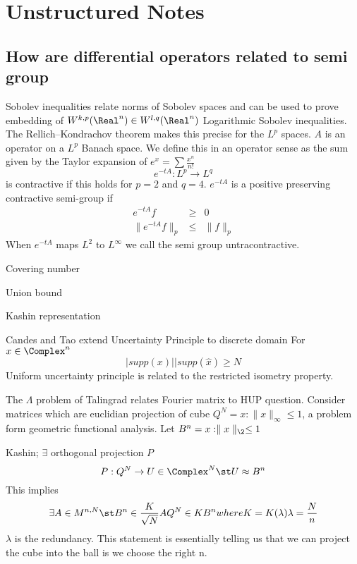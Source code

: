 \chapter{Unstructured Notes}
\section{How are differential operators related to semi group}
Sobolev inequalities relate norms of Sobolev spaces and can be used to prove embedding of $W^{k,p}(\Real^n) \in W^{l,q}(\Real^n)$ Logarithmic Sobolev inequalities.  The Rellich–Kondrachov theorem makes this precise for the $L^p$ spaces.
$A$ is an operator on a $L^p$ Banach space. We define this in an operator sense as the sum given by the Taylor expansion of $e^x = \sum \frac{x^n}{n!}$
\begin{equation*}
  e^{-t A} : L^p \rightarrow L^q
\end{equation*} is contractive if this holds for $p=2$ and $q=4$.
$e^{-t A}$ is a positive preserving contractive semi-group if
\begin{eqnarray*}
  e^{-t A} f &\geq& 0 \\
  \parallel e^{-t A} f \parallel_p &\leq& \parallel f \parallel_p
\end{eqnarray*} 
When $e^{-t A}$ maps $L^2$ to $L^\infty$ we call the semi group untracontractive. 

Covering number

Union bound

Kashin representation

Candes and Tao extend Uncertainty Principle to discrete domain 
For $x \in \Complex^n$
\begin{equation*}
  |supp(x)| |supp(\hat{x}) \geq N
\end{equation*} 
Uniform uncertainty principle is related to the restricted isometry property.  

The $\Lambda$ problem of Talingrad relates Fourier matrix to HUP question.  Consider matrices which are euclidian projection of cube $Q^N = {x : \parallel x \parallel_\infty  \leq 1}$, a problem form geometric functional analysis.  Let $B^n = {x : \parallel x \parallel_\2  \leq 1}$

Kashin; $\exists$ orthogonal projection $P$ 
\begin{equation*}
  P : Q^N \rightarrow U \in \Complex^N \st U \approx B^n
\end{equation*}
This implies 
\begin{equation*}
  \exists A \in M^{n,N} \st B^n \in \frac{K}{\sqrt{N}} A Q^N \in K B^n where K = K(\lambda) \lambda=\frac{N}{n}
\end{equation*}
$\lambda$ is the redundancy.  This statement is essentially telling us that we can project the cube into the ball is we choose the right n.

  